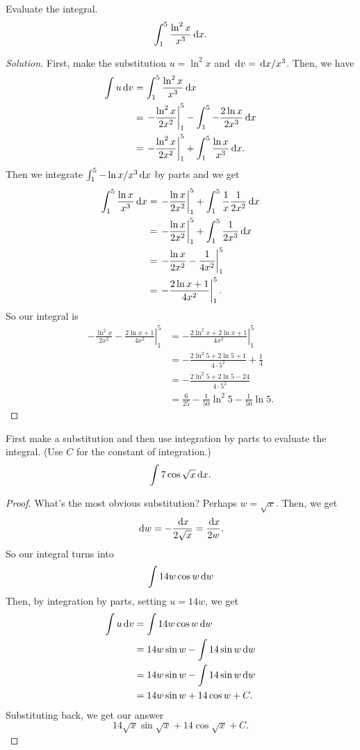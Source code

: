\begin{problem}[WebAssign HW 9, 7]
Evaluate the integral.
\[
\int_1^5\frac{\ln^2 x}{x^3}\,\mathrm{d} x.
\]
\end{problem}
\begin{proof}[Solution]
First, make the substitution $u=\ln^2 x$ and $\,\mathrm{d} v=\,\mathrm{d} x/x^3$. Then,
we have
\begin{align*}
\int u\,\mathrm{d} v&=\int_1^5\frac{\ln^2 x}{x^3}\,\mathrm{d} x\\
             &=\left.-\frac{\ln^2 x}{2x^2}\right|_1^5
               -\int_1^5-\frac{2\ln x}{2x^3}\,\mathrm{d} x\\
             &=\left.-\frac{\ln^2 x}{2x^2}\right|_1^5
               +\int_1^5\frac{\ln x}{x^3}\,\mathrm{d} x.
\end{align*}
Then we integrate $\int_1^5-\ln x/x^3\,\mathrm{d} x$ by parts and we get
\begin{align*}
\int_1^5\frac{\ln x}{x^3}\,\mathrm{d} x
&=\left.-\frac{\ln x}{2x^2}\right|_1^5
+\int_1^5\frac{1}{x}\frac{1}{2x^2}\,\mathrm{d} x\\
&=\left.-\frac{\ln x}{2x^2}\right|_1^5
+\int_1^5\frac{1}{2x^3}\,\mathrm{d} x\\
&=\left.-\frac{\ln x}{2x^2}-\frac{1}{4x^2}\right|_1^5\\
&=\left.-\frac{2\ln x+1}{4x^2}\right|_1^5.
\end{align*}
So our integral is
\begin{align*}
\left.-\frac{\ln^2 x}{2x^2}-\frac{2\ln x+1}{4x^2}\right|_1^5
&=\left.-\frac{2\ln^2 x+2\ln x+1}{4x^2}\right|_1^5\\
&=-\frac{2\ln^2 5+2\ln 5+1}{4\cdot 5^2}+\frac{1}{4}\\
&=-\frac{2\ln^2 5+2\ln 5-24}{4\cdot 5^2}\\
&=\boxed{\frac{6}{25}-\tfrac{1}{50}\ln^2 5-\tfrac{1}{50}\ln 5.}
\end{align*}
\end{proof}

\begin{problem}[WebAssign HW 9, 8]
First make a substitution and then use integration by parts to evaluate the
integral. (Use $C$ for the constant of integration.)
\[
\int 7\cos\sqrt{x}\,\mathrm{d} x.
\]
\end{problem}
\begin{proof}
What's the most obvious substitution? Perhaps $w=\sqrt{x}$. Then, we get
\[\,\mathrm{d} w=-\frac{\,\mathrm{d} x}{2\sqrt{x}}=\frac{\,\mathrm{d} x}{2w}.\]
So our integral turns into
\[
\int 14 w\cos w\,\mathrm{d} w
\]
Then, by integration by parts, setting $u=14w$, we get
\begin{align*}
  \int u\,\mathrm{d} v&=\int 14w\cos w\,\mathrm{d} w\\
               &=14w\sin w-\int 14\sin w\,\mathrm{d} w\\
               &=14w\sin w-\int 14\sin w\,\mathrm{d} w\\
               &=14w\sin w+14\cos w+C.
\end{align*}
Substituting back, we get our answer
\[
\boxed{14\sqrt{x}\sin\sqrt{x}+14\cos\sqrt{x}+C.}
\]
\end{proof}

